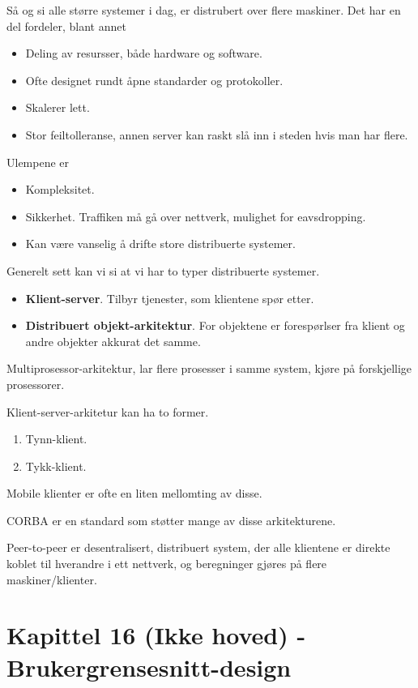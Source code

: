 \documentclass[11pt]{article}
\begin{document}
  Så og si alle større systemer i dag, er distrubert over flere maskiner. Det har en del fordeler, blant annet

\begin{itemize}
\item Deling av resursser, både hardware og software.
\item Ofte designet rundt åpne standarder og protokoller.
\item Skalerer lett.
\item Stor feiltolleranse, annen server kan raskt slå inn i steden hvis man har flere.
\end{itemize}

  Ulempene er

\begin{itemize}
\item Kompleksitet.
\item Sikkerhet.
    Traffiken må gå over nettverk, mulighet for eavsdropping.
\item Kan være vanselig å drifte store distribuerte systemer.
\end{itemize}

  Generelt sett kan vi si at vi har to typer distribuerte systemer.

\begin{itemize}
\item \textbf{Klient-server}. Tilbyr tjenester, som klientene spør etter.
\item \textbf{Distribuert objekt-arkitektur}. For objektene er forespørlser fra klient og andre objekter akkurat det samme.
\end{itemize}

  Multiprosessor-arkitektur, lar flere prosesser i samme system, kjøre på forskjellige prosessorer.

  Klient-server-arkitetur kan ha to former.

\begin{enumerate}
\item Tynn-klient.
\item Tykk-klient.
\end{enumerate}

  Mobile klienter er ofte en liten mellomting av disse.

  CORBA er en standard som støtter mange av disse arkitekturene.

  Peer-to-peer er desentralisert, distribuert system, der alle klientene er direkte
  koblet til hverandre i ett nettverk, og beregninger gjøres på flere maskiner/klienter.
\section{Kapittel 16 (Ikke hoved) - Brukergrensesnitt-design}
\label{sec-15}
\end{document}
